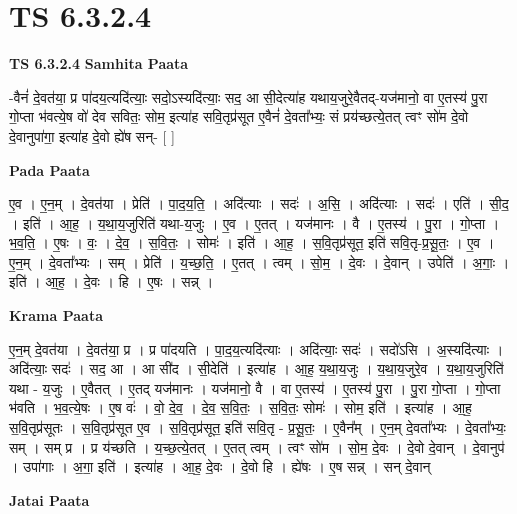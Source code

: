 \documentclass[17pt]{extarticle}
\begin{document}
\section{ TS 6.3.2.4 }

\textbf{TS 6.3.2.4 } \newline
\textbf{Samhita Paata} \newline

-वैनं॑ दे॒वत॑या॒ प्र पा॑दय॒त्यदि॑त्याः॒ सदो॒ऽस्यदि॑त्याः॒ सद॒ आ सी॒देत्या॑ह यथाय॒जुरे॒वैतद्-यज॑मानो॒ वा ए॒तस्य॑ पु॒रा गो॒प्ता भ॑वत्ये॒ष वो॑ देव सवितः॒ सोम॒ इत्या॑ह सवि॒तृप्र॑सूत ए॒वैनं॑ दे॒वता᳚भ्यः॒ सं प्रय॑च्छत्ये॒तत् त्वꣳ सो॑म दे॒वो दे॒वानुपा॑गा॒ इत्या॑ह दे॒वो ह्ये॑ष सन्- [  ] \newline

\textbf{Pada Paata} \newline

ए॒व । ए॒न॒म् । दे॒वत॑या । प्रेति॑ । पा॒द॒य॒ति॒ । अदि॑त्याः । सदः॑ । अ॒सि॒ । अदि॑त्याः । सदः॑ । एति॑ । सी॒द॒ । इति॑ । आ॒ह॒ । य॒था॒य॒जुरिति॑ यथा-य॒जुः । ए॒व । ए॒तत् । यज॑मानः । वै । ए॒तस्य॑ । पु॒रा । गो॒प्ता । भ॒व॒ति॒ । ए॒षः । वः॒ । दे॒व॒ । स॒वि॒तः॒ । सोमः॑ । इति॑ । आ॒ह॒ । स॒वि॒तृप्र॑सूत॒ इति॑ सवि॒तृ-प्र॒सू॒तः॒ । ए॒व । ए॒न॒म् । दे॒वता᳚भ्यः । सम् । प्रेति॑ । य॒च्छ॒ति॒ । ए॒तत् । त्वम् । सो॒म॒ । दे॒वः । दे॒वान् । उपेति॑ । अ॒गाः॒ । इति॑ । आ॒ह॒ । दे॒वः । हि । ए॒षः । सन्न् ।  \newline


\textbf{Krama Paata} \newline

ए॒न॒म् दे॒वत॑या । दे॒वत॑या॒ प्र । प्र पा॑दयति । पा॒द॒य॒त्यदि॑त्याः । अदि॑त्याः॒ सदः॑ । सदो॑ऽसि । अ॒स्यदि॑त्याः । अदि॑त्याः॒ सदः॑ । सद॒ आ । आ सी॑द । सी॒देति॑ । इत्या॑ह । आ॒ह॒ य॒था॒य॒जुः । य॒था॒य॒जुरे॒व । य॒था॒य॒जुरिति॑ यथा - य॒जुः । ए॒वैतत् । ए॒तद् यज॑मानः । यज॑मानो॒ वै । वा ए॒तस्य॑ । ए॒तस्य॑ पु॒रा । पु॒रा गो॒प्ता । गो॒प्ता भ॑वति । भ॒व॒त्ये॒षः । ए॒ष वः॑ । वो॒ दे॒व॒ । दे॒व॒ स॒वि॒तः॒ । स॒वि॒तः॒ सोमः॑ । सोम॒ इति॑ । इत्या॑ह । आ॒ह॒ स॒वि॒तृप्र॑सूतः । स॒वि॒तृप्र॑सूत ए॒व । स॒वि॒तृप्र॑सूत॒ इति॑ सवि॒तृ - प्र॒सू॒तः॒ । ए॒वैन᳚म् । ए॒न॒म् दे॒वता᳚भ्यः । दे॒वता᳚भ्यः॒ सम् । सम् प्र । प्र य॑च्छति । य॒च्छ॒त्ये॒तत् । ए॒तत् त्वम् । त्वꣳ सो॑म । सो॒म॒ दे॒वः । दे॒वो दे॒वान् । दे॒वानुप॑ । उपा॑गाः । अ॒गा॒ इति॑ । इत्या॑ह । आ॒ह॒ दे॒वः । दे॒वो हि । ह्ये॑षः । ए॒ष सन्न् । सन् दे॒वान् \newline

\textbf{Jatai Paata} \newline
\end{document}
